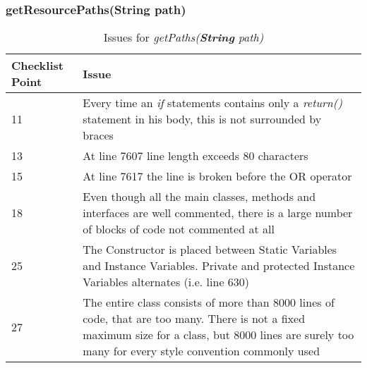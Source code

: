 \subsubsection{getResourcePaths(String path)}
\begin{table}[htbp]
\begin{center}
\begin{tabular}[t]{p{}p{}}

\hline
\textbf{Checklist Point} & \textbf{Issue} \\
\hline
11 & Every time an \textit{if} statements contains only a \textit{return()} statement in his body, this is not surrounded by braces \\
\hline
13 & At line 7607 line length exceeds 80 characters \\
\hline
15 & At line 7617 the line is broken before the OR operator \\
\hline
18 & Even though all the main classes, methods and interfaces are well commented, there is a large number of blocks of code not commented at all \\
\hline
25 & The Constructor is placed between Static Variables and  Instance Variables. Private and protected Instance Variables alternates (i.e. line 630) \\
\hline
27 & The entire class consists of more than 8000 lines of code, that are too many. There is not a fixed maximum size for a class, but 8000 lines are surely too many for every style convention commonly used \\
\hline

\end{tabular}
\end{center}
\caption{Issues for \textit{getPaths(\textbf{String} path)}}
\end{table}
\clearpage

